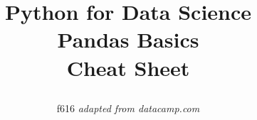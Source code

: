 \documentclass[10pt,a4paper]{article}
\title{
\raggedright
{\textbf{\color{black} Python for Data Science\\
\color{alert}Pandas Basics}}
\color{black}\large\\Cheat Sheet}
\author{f616 \emph{adapted from datacamp.com}}
\date{}
\begin{document}
\small
\begin{multicols}{2}

\maketitle
\thispagestyle{empty}
\scriptsize






\end{multicols}
\end{document}
